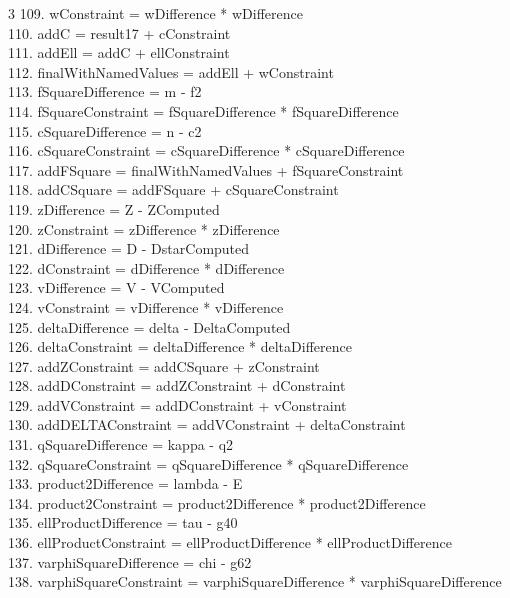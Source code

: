 \documentclass[10pt]{article}
\begin{document}
\begin{multicols}{3}
109. wConstraint = wDifference * wDifference\\
110. addC = result17 + cConstraint\\
111. addEll = addC + ellConstraint\\
112. finalWithNamedValues = addEll + wConstraint\\
113. fSquareDifference = m - f2\\
114. fSquareConstraint = fSquareDifference * fSquareDifference\\
115. cSquareDifference = n - c2\\
116. cSquareConstraint = cSquareDifference * cSquareDifference\\
117. addFSquare = finalWithNamedValues + fSquareConstraint\\
118. addCSquare = addFSquare + cSquareConstraint\\
119. zDifference = Z - ZComputed\\
120. zConstraint = zDifference * zDifference\\
121. dDifference = D - DstarComputed\\
122. dConstraint = dDifference * dDifference\\
123. vDifference = V - VComputed\\
124. vConstraint = vDifference * vDifference\\
125. deltaDifference = delta - DeltaComputed\\
126. deltaConstraint = deltaDifference * deltaDifference\\
127. addZConstraint = addCSquare + zConstraint\\
128. addDConstraint = addZConstraint + dConstraint\\
129. addVConstraint = addDConstraint + vConstraint\\
130. addDELTAConstraint = addVConstraint + deltaConstraint\\
131. qSquareDifference = kappa - q2\\
132. qSquareConstraint = qSquareDifference * qSquareDifference\\
133. product2Difference = lambda - E\\
134. product2Constraint = product2Difference * product2Difference\\
135. ellProductDifference = tau - g40\\
136. ellProductConstraint = ellProductDifference * ellProductDifference\\
137. varphiSquareDifference = chi - g62\\
138. varphiSquareConstraint = varphiSquareDifference * varphiSquareDifference\\

\end{multicols}
\end{document}
